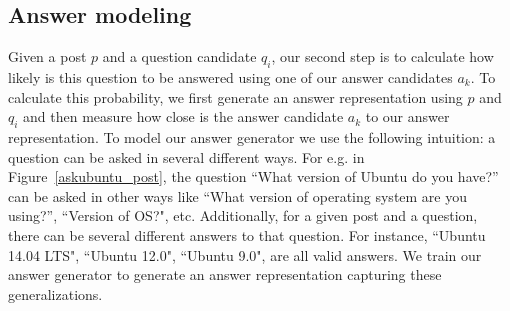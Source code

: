 \documentclass[11pt,a4paper]{article}
\begin{document}
\subsection{Answer modeling}\label{answer_modeling}

Given a post $p$ and a question candidate $q_i$, our second step is to calculate how likely is this question to be answered using one of our answer candidates $a_k$. To calculate this probability, we first generate an answer representation using $p$ and $q_i$ and then measure how close is the answer candidate $a_k$ to our answer representation. To model our answer generator we use the following intuition: a question can be asked in several different ways. For e.g. in Figure~\ref{askubuntu_post}, the question ``\textsf{\small What version of Ubuntu do you have?}'' can be asked in other ways like ``\textsf{\small What version of operating system are you using?}'', ``\textsf{\small Version of OS?}", etc.  
Additionally, for a given post and a question, there can be several different answers to that question. For instance, ``\textsf{\small Ubuntu 14.04 LTS}", ``\textsf{\small Ubuntu 12.0}", ``\textsf{\small Ubuntu 9.0}", are all valid answers. We train our answer generator to generate an answer representation capturing these generalizations.
\end{document}
